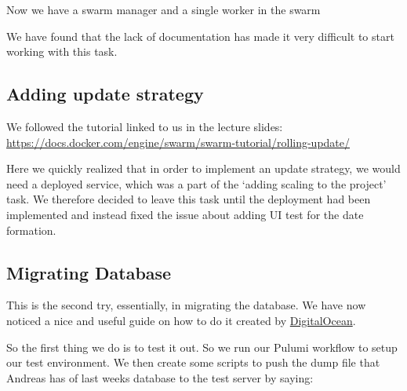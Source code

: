 

Now we have a swarm manager and a single worker in the swarm

We have found that the lack of documentation has made it very difficult to start working with this task.

\subsection{Adding update strategy}
\label{log:adding-update-strategy}

We followed the tutorial linked to us in the lecture slides: \url{https://docs.docker.com/engine/swarm/swarm-tutorial/rolling-update/}

Here we quickly realized that in order to implement an update strategy, we would need a deployed service, which was a part of the `adding scaling to the project' task. We therefore decided to leave this task until the deployment had been implemented and instead fixed the issue about adding UI test for the date formation.

\subsection{Migrating Database}
\label{log:migrating-database}

This is the second try, essentially, in migrating the database. We have now noticed a nice and useful guide on how to do it created by \href{https://docs.digitalocean.com/products/databases/postgresql/how-to/import-databases/}{DigitalOcean}.

So the first thing we do is to test it out. So we run our Pulumi workflow to setup our test environment. We then create some scripts to push the dump file that Andreas has of last weeks database to the test server by saying:


